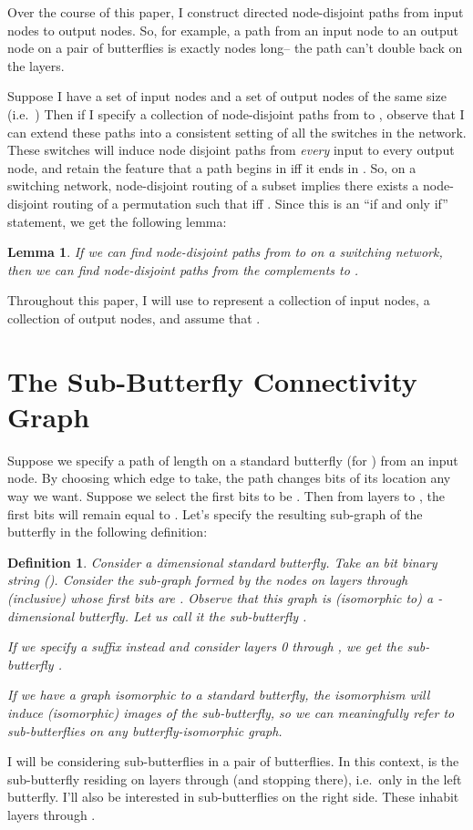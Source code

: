 \documentclass[12pt]{article}
\newtheorem{lemma}{Lemma}
\newtheorem{definition}{Definition}
\begin{document}
Over the course of this paper, I construct directed node-disjoint 
paths from input nodes to output nodes.  So, for example, a path from an 
input
node to an output node on a pair of butterflies is exactly  nodes
long-- the path can't double back on the layers.  

Suppose I have a set of input nodes  and a set of output nodes  of the
same size (i.e.\ )
Then if I specify a collection of node-disjoint paths from  to , observe
that I can extend these paths into a consistent setting of all the 
switches in the network.  These switches will induce   node disjoint
paths from \emph{every} input to every output node, and retain the
feature that a path begins in  iff it ends in .  So, on a
switching network, node-disjoint routing of a subset implies there
exists a node-disjoint routing of a permutation  such that 
 iff .  Since this is an ``if and only if'' statement,
we get the following lemma:
\begin{lemma} \label{set complement}
If we can find node-disjoint paths from  to  on a switching
network, then we can find node-disjoint paths from the complements
 to .
\end{lemma}
Throughout this paper, I will use  to represent a collection of
input nodes,  a collection of output nodes, and assume that
.

\section{The Sub-Butterfly Connectivity Graph} \label{connectivity}

Suppose we specify a path of length  on a standard butterfly 
(for ) from an input node.
By choosing which edge to take, the path changes  bits of its
location any way we want.  Suppose we select the first bits to be
.  Then from layers  to , 
the first  bits will remain equal to .  Let's specify 
the resulting sub-graph of the butterfly in the following definition:

\begin{definition}
Consider a  dimensional standard butterfly.  Take an  bit
binary string   ().
Consider the sub-graph formed by the nodes on layers  through 
(inclusive) whose first  bits are .  Observe that this graph
is (isomorphic to) a -dimensional butterfly.  Let us call it 
the \emph{sub-butterfly }.

If we specify a suffix instead and consider layers 0 through ,
we get the \emph{sub-butterfly }.

If we have a graph isomorphic to a standard butterfly, the isomorphism
will induce (isomorphic) images of the sub-butterfly, so we can
meaningfully refer to sub-butterflies on any butterfly-isomorphic graph.
\end{definition}
I will be considering sub-butterflies in a pair of butterflies.  In
this context,  is the sub-butterfly residing on layers 
through  (and stopping there), i.e.\ only in the left butterfly.
I'll also be interested in sub-butterflies on the right side.  
These inhabit layers  through .
\end{document}
